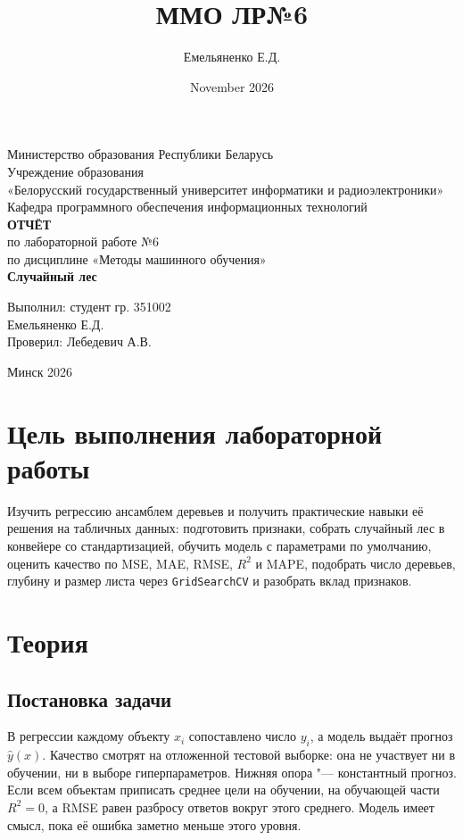 \documentclass[14pt]{extarticle}
\title{ММО ЛР№6}
\author{Емельяненко Е.Д.}
\date{November 2026}
\begin{document}
\begin{titlepage}
\centering
\singlespacing
Министерство образования Республики Беларусь\\[2mm]
Учреждение образования\\
«Белорусский государственный университет информатики и радиоэлектроники»\\[8mm]
Кафедра программного обеспечения информационных технологий\\[35mm]

\textbf{ОТЧЁТ}\\
по лабораторной работе №6\\
по дисциплине «Методы машинного обучения»\\[3mm]
\textbf{Случайный лес}\\[3mm]

\begin{flushright}
Выполнил: студент гр. 351002\\
Емельяненко Е.Д.\\[5mm]
Проверил: Лебедевич А.В.
\end{flushright}

\vfill
Минск 2026
\end{titlepage}

\setcounter{page}{2}
\tableofcontents
\newpage

\section{Цель выполнения лабораторной работы}

Изучить регрессию ансамблем деревьев и получить практические навыки её решения на табличных данных: подготовить признаки, собрать случайный лес в конвейере со стандартизацией, обучить модель с параметрами по умолчанию, оценить качество по MSE, MAE, RMSE, $R^2$ и MAPE, подобрать число деревьев, глубину и размер листа через \texttt{GridSearchCV} и разобрать вклад признаков.

\section{Теория}

\subsection{Постановка задачи}
В регрессии каждому объекту $x_i$ сопоставлено число $y_i$, а модель выдаёт прогноз $\hat y(x)$. Качество смотрят на отложенной тестовой выборке: она не участвует ни в обучении, ни в выборе гиперпараметров. Нижняя опора "--- константный прогноз. Если всем объектам приписать среднее цели на обучении, на обучающей части $R^2 = 0$, а RMSE равен разбросу ответов вокруг этого среднего. Модель имеет смысл, пока её ошибка заметно меньше этого уровня.
\end{document}
